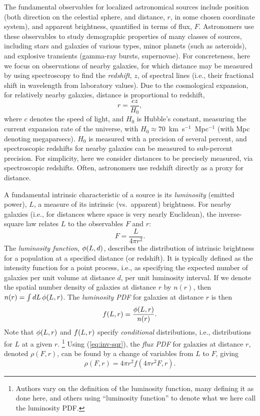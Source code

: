 The fundamental observables for localized astronomical sources include position (both direction on the celestial sphere, and distance, $r$, in some chosen coordinate system), and apparent brightness, quantified in terms of flux, $F$.
Astronomers use these observables to study demographic properties of many classes of sources, including stars and galaxies of various types, minor planets (such as asteroids), and explosive transients (gamma-ray bursts, supernovae).
For concreteness, here we focus on observations of nearby galaxies, for which distance may be measured by using spectroscopy to find the \emph{redshift}, $z$, of spectral lines (i.e., their fractional shift in wavelength from laboratory values).
Due to the cosmological expansion, for relatively nearby galaxies, distance is proportional to redshift,
\begin{equation}
r = \frac{cz}{H_0},
\label{eq:H0}
\end{equation}
where $c$ denotes the speed of light, and $H_0$ is Hubble's constant, measuring the current expansion rate of the universe, with $H_0 \approx 70$~km~s$^{-1}$~Mpc$^{-1}$ (with Mpc denoting megaparsecs).
$H_0$ is measured with a precision of several percent, and spectroscopic redshifts for nearby galaxies can be measured to sub-percent precision.
For simplicity, here we consider distances to be precisely measured, via spectroscopic redshifts.
Often, astronomers use redshift directly as a proxy for distance.

A fundamental intrinsic characteristic of a source is its \emph{luminosity} (emitted power), $L$, a measure of its intrinsic (vs.\ apparent) brightness.
For nearby galaxies (i.e., for distances where space is very nearly Euclidean), the inverse-square law relates $L$ to the observables $F$ and $r$:
\begin{equation}
F=\frac{L}{4\pi r^2}.
\label{eq:inv-sqr}
\end{equation}
The \emph{luminosity function}, $\phi(L, d)$, describes the distribution of intrinsic brightness for a population at a specified distance (or redshift).
It is typically defined as the intensity function for a point process, i.e., as specifying the expected number of galaxies per unit volume at distance $d$, per unit luminosity interval.
If we denote the spatial number density of galaxies at distance $r$ by $n(r)$, then $n(r) = \int dL\, \phi(L, r)$.
The \emph{luminosity PDF} for galaxies at distance $r$ is then
\begin{equation}
f(L,r) = \frac{\phi(L, r)}{n(r)}.
\label{eq:lpdf}
\end{equation}
Note that $\phi(L,r)$ and $f(L,r)$ specify \emph{conditional} distributions, i.e., distributions for $L$ at a given $r$.%
\footnote{Authors vary on the definition of the luminosity function, many defining it as done here, and others using ``luminosity function'' to denote what we here call the luminosity PDF.}
Using (\ref{eq:inv-sqr}), the \emph{flux PDF} for galaxies at distance $r$, denoted $\rho(F,r)$, can be found by a change of variables from $L$ to $F$, giving
\begin{equation}\label{eq:rho-f}
\rho(F,r) = 4\pi r^2 f(4\pi r^2 F, r).
\end{equation}

